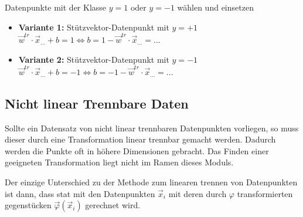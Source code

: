 \begin{enumerate}
        Datenpunkte mit der Klasse $y = 1$ oder $y = -1$ wählen und einsetzen
        \begin{itemize}
            \item \textbf{Variante 1:} Stützvektor-Datenpunkt mit $y = +1$\\
                $\boxed{\vec{w}^{tr}\cdot\vec{x}_{...} + b = 1} \Leftrightarrow  \boxed{b = 1 -\vec{w}^{tr}\cdot\vec{x}_{...} = ...}$
            \item \textbf{Variante 2:} Stützvektor-Datenpunkt mit $y = -1$\\
                $\boxed{\vec{w}^{tr}\cdot\vec{x}_{...} + b = -1} \Leftrightarrow  \boxed{b = -1 -\vec{w}^{tr}\cdot\vec{x}_{...} = ...}$
        \end{itemize}
\end{enumerate}


\subsection{Nicht linear Trennbare Daten}
Sollte ein Datensatz von nicht linear trennbaren Datenpunkten vorliegen, so muss dieser durch eine Transformation linear trennbar gemacht werden.
Dadurch werden die Punkte oft in höhere Dimensionen gebracht.
Das Finden einer geeigneten Transformation liegt nicht im Ramen dieses Moduls.

Der einzige Unterschied zu der Methode zum linearen trennen von Datenpunkten ist dann, dass stat mit den Datenpunkten $\vec{x}_i$ mit deren durch $\varphi$ transformierten gegenstücken $\vec{\varphi}(\vec{x}_i)$ gerechnet wird.